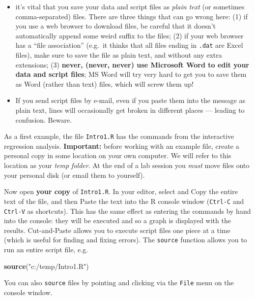 \documentclass[11pt,]{article}
\newenvironment{Shaded}{\begin{snugshade}}{\end{snugshade}}
\newcommand{\KeywordTok}[1]{\textcolor[rgb]{0.13,0.29,0.53}{\textbf{#1}}}
\newcommand{\StringTok}[1]{\textcolor[rgb]{0.31,0.60,0.02}{#1}}
\newcommand{\NormalTok}[1]{#1}
\begin{document}
\begin{itemize}
\item
  it's vital that you save your data and script files as \emph{plain
  text} (or sometimes comma-separated) files. There are three things
  that can go wrong here: (1) if you use a web browser to download
  files, be careful that it doesn't automatically append some weird
  suffix to the files; (2) if your web browser has a ``file
  association'' (e.g.~it thinks that all files ending in \texttt{.dat}
  are Excel files), make sure to save the file as plain text, and
  without any extra extensions; (3) \textbf{never, (never, never) use
  Microsoft Word to edit your data and script files}; MS Word will try
  very hard to get you to save them as Word (rather than text) files,
  which will screw them up!
\item
  If you send script files by e-mail, even if you paste them into the
  message as plain text, lines will occasionally get broken in different
  places --- leading to confusion. Beware.
\end{itemize}

As a first example, the file \texttt{Intro1.R} has the commands from the
interactive regression analysis. \textbf{Important:} before working with
an example file, create a personal copy in some location on your own
computer. We will refer to this location as your \emph{temp folder}. At
the end of a lab session you \emph{must} move files onto your personal
disk (or email them to yourself).

Now open \textbf{your copy} of \texttt{Intro1.R}. In your editor, select
and Copy the entire text of the file, and then Paste the text into the R
console window (\texttt{Ctrl-C} and \texttt{Ctrl-V} as shortcuts). This
has the same effect as entering the commands by hand into the console:
they will be executed and so a graph is displayed with the results.
Cut-and-Paste allows you to execute script files one piece at a time
(which is useful for finding and fixing errors). The \texttt{source}
function allows you to run an entire script file, e.g.

\begin{Shaded}
\begin{Highlighting}[]
\KeywordTok{source}\NormalTok{(}\StringTok{"c:/temp/Intro1.R"}\NormalTok{)}
\end{Highlighting}
\end{Shaded}

You can also \texttt{source} files by pointing and clicking via the
\texttt{File} menu on the console window.
\end{document}
